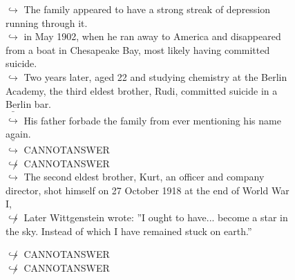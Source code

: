 \documentclass[11pt,a4paper, onecolumn]{article}
\begin{document}
\begin{figure}[t] \small \begin{tcolorbox}[boxsep=0pt,left=5pt,right=0pt,top=2pt,colback = yellow!5] \begin{dialogue}
 \small 
\colorbox{pink!25}{$\hookrightarrow$}
{ The family appeared to have a strong streak of depression running through it. }
\\
\colorbox{pink!25}{$\hookrightarrow$}
{ in May 1902, when he ran away to America and disappeared from a boat in Chesapeake Bay, most likely having committed suicide. }
\\
\colorbox{pink!25}{$\hookrightarrow$}
{ Two years later, aged 22 and studying chemistry at the Berlin Academy, the third eldest brother, Rudi, committed suicide in a Berlin bar. }
\\
\colorbox{pink!25}{ $\bar{\hookrightarrow}$}
{ His father forbade the family from ever mentioning his name again. }
\\
\colorbox{pink!25}{ $\bar{\hookrightarrow}$}
{ CANNOTANSWER }
\\
\colorbox{pink!25}{$\not\hookrightarrow$}
{ CANNOTANSWER }
\\
\colorbox{pink!25}{$\hookrightarrow$}
{ The second eldest brother, Kurt, an officer and company director, shot himself on 27 October 1918 at the end of World War I, }
\\
\colorbox{pink!25}{$\not\hookrightarrow$}
{ Later Wittgenstein wrote: ''I ought to have... become a star in the sky. Instead of which I have remained stuck on earth.'' }
 \end{dialogue}\end{tcolorbox}\end{figure}\begin{figure}[t] \small \begin{tcolorbox}[boxsep=0pt,left=5pt,right=0pt,top=2pt,colback = yellow!5] \begin{dialogue}
 \small 
\colorbox{pink!25}{$\not\hookrightarrow$}
{ CANNOTANSWER }
\\
\colorbox{pink!25}{$\not\hookrightarrow$}
{ CANNOTANSWER }
\\
 \end{dialogue}\end{tcolorbox}\end{figure}
\end{document}
